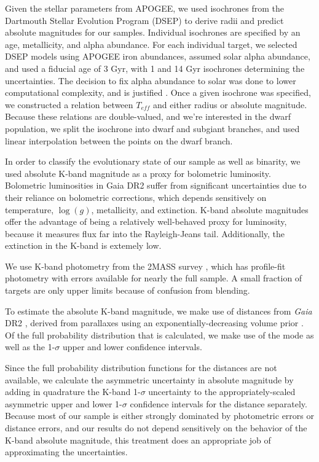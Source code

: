 \documentclass[manuscript]{aastex6}
\newcommand{\Gaia}{\mbox{\textit{Gaia}}}
\newcommand{\Teff}{\ensuremath{T_{eff}}}
\newcommand{\logg}{\ensuremath{\log(g)}}
\newcommand{\gvs}{\authorcomment1}
\begin{document}
Given the stellar parameters from APOGEE, we used isochrones from the Dartmouth
Stellar Evolution Program (DSEP) \citep{Dotter07,Dotter08} to derive
radii and predict absolute magnitudes for our samples. Individual
isochrones are specified by an age,
metallicity, and alpha abundance. For each individual target, we
selected DSEP models using APOGEE iron abundances, assumed solar alpha 
abundance, and used a fiducial age of 3 Gyr, with 1 and 14 Gyr
isochrones determining the uncertainties. The decision to fix alpha
abundance to solar was done to lower computational complexity, and is
justified \gvs{Plot a histogram to check this}. Once a given isochrone
was specified, we constructed a relation between \Teff{} and either radius
or absolute magnitude. Because these relations are double-valued, and
we're interested in the dwarf population, we split the isochrone into 
dwarf and subgiant branches, and used linear interpolation between the
points on the dwarf branch.

In order to classify the evolutionary state of our sample as well as
binarity, we used absolute K-band magnitude as a proxy for bolometric
luminosity. Bolometric luminosities in Gaia DR2 suffer from significant
uncertainties due to their reliance on bolometric corrections, which
depends sensitively on temperature, \logg{}, metallicity, and extinction. 
K-band absolute magnitudes offer the advantage of being a relatively 
well-behaved proxy for luminosity, because it measures flux far into the 
Rayleigh-Jeans tail. Additionally, the extinction in the K-band
is extemely low.

We use K-band photometry from the 2MASS survey \citep{Skrutskie06}, which has
profile-fit photometry with errors available for nearly the full sample. A 
small fraction of targets are only upper limits because of confusion from 
blending. \gvs{Calculate fraction}

To estimate the absolute K-band magnitude, we make use of distances from
\Gaia{} DR2 \citep{Gaia16,Gaia18}, derived from parallaxes using an
exponentially-decreasing volume prior \citep{Berger18b}. Of the full probability
distribution that is calculated, we make use of the mode as well as the
1-\(\sigma\) upper and lower confidence intervals.

Since the full probability distribution functions for the distances are
not available, we calculate the asymmetric uncertainty in absolute
magnitude by adding in quadrature the K-band 1-\(\sigma\) uncertainty to
the appropriately-scaled asymmetric upper and lower 1-\(\sigma\) confidence 
intervals for the distance separately. Because most of our sample is
either strongly dominated by photometric errors or distance errors, and
our results do not depend sensitively on the behavior of the K-band
absolute magnitude, this treatment does an appropriate job of
approximating the uncertainties.
\end{document}
